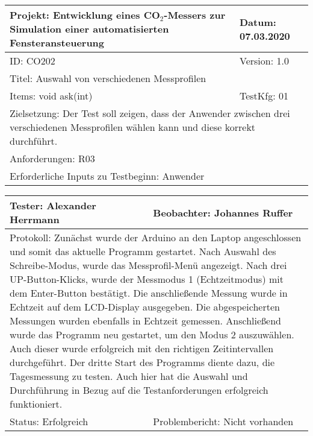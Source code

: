 \begin{table}[!htb]
	\centering
	\begin{tabular}{|p{8cm}|p{8cm}|}
		\hline
		Projekt: Entwicklung eines CO$_2$-Messers zur Simulation einer automatisierten Fensteransteuerung & Datum: 07.03.2020 \\
		\hline
		ID: CO202 & Version: 1.0 \\
		\hline
		\multicolumn{2}{|l|}{Titel: Auswahl von verschiedenen Messprofilen} \\
		\hline
		Items: void ask(int) & TestKfg: 01 \\
		\hline
		\multicolumn{2}{|p{\textwidth-2\tabcolsep}|}{Zielsetzung: Der Test soll zeigen, dass der Anwender zwischen drei verschiedenen Messprofilen wählen kann und diese korrekt durchführt.} \\
		\hline
		\multicolumn{2}{|l|}{Anforderungen: R03} \\
		\hline
		\multicolumn{2}{|l|}{Erforderliche Inputs zu Testbeginn: Anwender} \\
		\hline
	\end{tabular}
	\label{tab:Test_2}
\end{table}

\begin{table}[!htb]
	\centering
	\begin{tabular}{|p{8cm}|p{8cm}|}
		\hline
		Tester: Alexander Herrmann & Beobachter: Johannes Ruffer \\
		\hline
		\multicolumn{2}{|p{\textwidth-2\tabcolsep}|}{Protokoll: \newline Zunächst wurde der Arduino an den Laptop angeschlossen und somit das aktuelle Programm gestartet. Nach Auswahl des Schreibe-Modus, wurde das Messprofil-Menü angezeigt. Nach drei UP-Button-Klicks, wurde der Messmodus 1 (Echtzeitmodus) mit dem Enter-Button bestätigt. \newline Die anschließende Messung wurde in Echtzeit auf dem \ac{LCD}-Display ausgegeben. Die abgespeicherten Messungen wurden ebenfalls in Echtzeit gemessen. Anschließend wurde das Programm neu gestartet, um den Modus 2 auszuwählen. Auch dieser wurde erfolgreich mit den richtigen Zeitintervallen durchgeführt. \newline Der dritte Start des Programms diente dazu, die Tagesmessung zu testen. Auch hier hat die Auswahl und Durchführung in Bezug auf die Testanforderungen erfolgreich funktioniert.} \\
		\hline
		Status: Erfolgreich & Problembericht: Nicht vorhanden \\
		\hline
	\end{tabular}
	\label{tab:Tester2}
\end{table}
